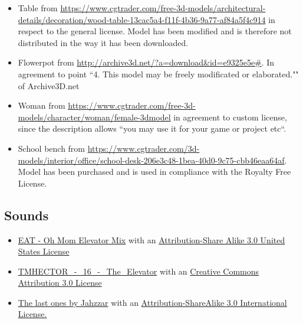 \documentclass[12pt]{article}
\begin{document}
\begin{itemize}
\item Table from \url{https://www.cgtrader.com/free-3d-models/architectural-details/decoration/wood-table-13cac5a4-f11f-4b36-9a77-af84a5f4c914} in respect to the general license. Model has been modified and is therefore not distributed in the way it has been downloaded.

\item Flowerpot from \url{http://archive3d.net/?a=download\&id=e9325e5e#}. In agreement to point ``4. This model may be freely modificated or elaborated."" of Archive3D.net

\item Woman from \url{https://www.cgtrader.com/free-3d-models/character/woman/female-3dmodel} in agreement to custom license, since the description allows ``you may use it for your game or project etc``.

\item School bench from
\url{ https://www.cgtrader.com/3d-models/interior/office/school-desk-206e3c48-1bea-40d0-9c75-cbb46eaa64af}. Model has been purchased and is used in compliance with the Royalty Free License.


\end{itemize}

\subsection{Sounds}

\begin{itemize}
\item \href{http://freemusicarchive.org/music/EAT/20100129104001364/Oh_Mom_Elevator_Mix}{EAT - Oh Mom Elevator Mix} with an \href{http://creativecommons.org/licenses/by-sa/3.0/us/}{Attribution-Share Alike 3.0 United States License}
\item \href{http://freemusicarchive.org/music/TMHECTOR/The_Haunted_Mansion/DS10Forumcom\_-\_DS10Forumcom\_-\_The_Haunted_Mansion\_-\_16\_The\_Elevator}{TMHECTOR\_-\_16\_-\_The\_Elevator} with an \href{http://creativecommons.org/licenses/by/3.0/}{Creative Commons Attribution 3.0 License}

\item \href{http://freemusicarchive.org/music/Jahzzar/Smoke_Factory/The_last_ones}{The last ones by Jahzzar} with an \href{http://creativecommons.org/licenses/by-sa/3.0/}{Attribution-ShareAlike 3.0 International License.}

\end{itemize}
\end{document}
